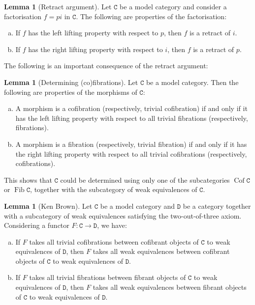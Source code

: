 \documentclass[11pt, reqno]{amsart}
\theoremstyle{definition}
\newtheorem{lemma}[theorem]{Lemma}
\newcommand{\cat}{\texttt}
\DeclareMathOperator{\Cof}{Cof} %
\DeclareMathOperator{\Fib}{Fib} %
\begin{document}
\begin{lemma}[Retract argument]
\label{lem:retract-argument}
Let \(\cat C\) be a model category and consider a factorisation \(f = p i\) in
\(\cat C\). The following are properties of the factorisation:
\begin{enumerate}[(a)]\setlength\itemsep{0em}
\item If \(f\) has the left lifting property with respect to \(p\), then \(f\)
  is a retract of \(i\).

\item If \(f\) has the right lifting property with respect to \(i\), then \(f\)
  is a retract of \(p\).
\end{enumerate}
\end{lemma}

The following is an important consequence of the retract argument:

\begin{lemma}[Determining (co)fibrations]
\label{lem:determining-cofibrations-and-fibrations}
Let \(\cat C\) be a model category. Then the following are properties of
the morphisms of \(\cat C\):
\begin{enumerate}[(a)]\setlength\itemsep{0em}
\item A morphism is a cofibration (respectively, trivial cofibration) if and
  only if it has the left lifting property with respect to all trivial
  fibrations (respectively, fibrations).

\item A morphism is a fibration (respectively, trivial fibration) if and
  only if it has the right lifting property with respect to all trivial
  cofibrations (respectively, cofibrations).
\end{enumerate}
This shows that \(\cat C\) could be determined using only one of the
subcategories \(\Cof \cat C\) or \(\Fib \cat C\), together with the subcategory of
weak equivalences of \(\cat C\).
\end{lemma}

\begin{lemma}[Ken Brown]
\label{lem:ken-brown}
Let \(\cat C\) be a model category and \(\cat D\) be a category together with a
subcategory of weak equivalences satisfying the two-out-of-three
axiom. Considering a functor \(F: \cat C \to \cat D\), we have:
\begin{enumerate}[(a)]\setlength\itemsep{0em}
\item If \(F\) takes all trivial cofibrations between cofibrant objects of
  \(\cat C\) to weak equivalences of \(\cat D\), then \(F\) takes all weak
  equivalences between cofibrant objects of \(\cat C\) to weak equivalences of
  \(\cat D\).

\item If \(F\) takes all trivial fibrations between fibrant objects of
  \(\cat C\) to weak equivalences of \(\cat D\), then \(F\) takes all weak
  equivalences between fibrant objects of \(\cat C\) to weak equivalences of
  \(\cat D\).
\end{enumerate}
\end{lemma}
\end{document}
